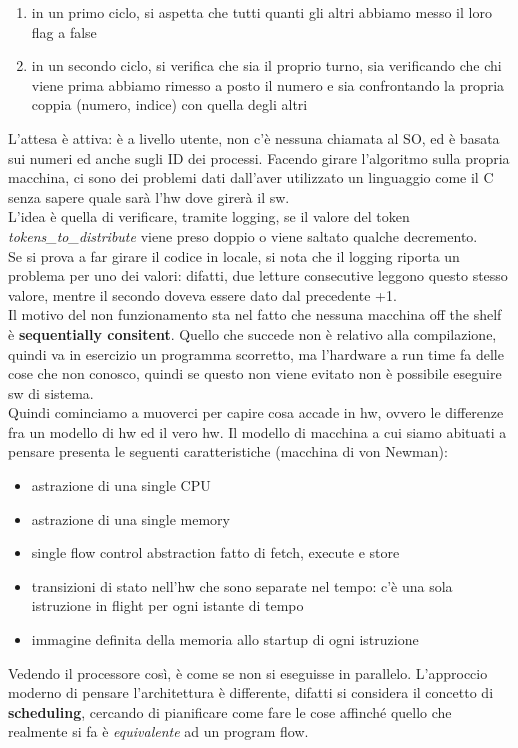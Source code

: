 \documentclass[12pt, oneside]{extbook}
\begin{document}
\begin{enumerate}
\item in un primo ciclo, si aspetta che tutti quanti gli altri abbiamo messo il loro flag a false
\item in un secondo ciclo, si verifica che sia il proprio turno, sia verificando che chi viene prima abbiamo rimesso a posto il numero e sia confrontando la propria coppia (numero, indice) con quella degli altri
\end{enumerate} L'attesa è attiva: è a livello utente, non c'è nessuna chiamata al SO, ed è basata sui numeri ed anche sugli ID dei processi. Facendo girare l'algoritmo sulla propria macchina, ci sono dei problemi dati dall'aver utilizzato un linguaggio come il C senza sapere quale sarà l'hw dove girerà il sw. \\ L'idea è quella di verificare, tramite logging, se il valore del token \textit{tokens\_to\_distribute} viene preso doppio o viene saltato qualche decremento.\\ Se si prova a far girare il codice in locale, si nota che il logging riporta un problema per uno dei valori: difatti, due letture consecutive leggono questo stesso valore, mentre il secondo doveva essere dato dal precedente +1.\\ Il motivo del non funzionamento sta nel fatto che nessuna macchina off the shelf è \textbf{sequentially consitent}. Quello che succede non è relativo alla compilazione, quindi va in esercizio un programma scorretto, ma l'hardware a run time fa delle cose che non conosco, quindi se questo non viene evitato non è possibile eseguire sw di sistema.\\ Quindi cominciamo a muoverci per capire cosa accade in hw, ovvero le differenze fra un modello di hw ed il vero hw. Il modello di macchina a cui siamo abituati a pensare presenta le seguenti caratteristiche (macchina di von Newman):
\begin{itemize}
\item astrazione di una single CPU
\item astrazione di una single memory
\item single flow control abstraction fatto di fetch, execute e store
\item transizioni di stato nell'hw che sono separate nel tempo: c'è una sola istruzione in flight per ogni istante di tempo
\item immagine definita della memoria allo startup di ogni istruzione
\end{itemize}
Vedendo il processore così, è come se non si eseguisse in parallelo. L'approccio moderno di pensare l'architettura è differente, difatti si considera il concetto di \textbf{scheduling}, cercando di pianificare come fare le cose affinché quello che realmente si fa è \textit{equivalente} ad un program flow.
\end{document}
